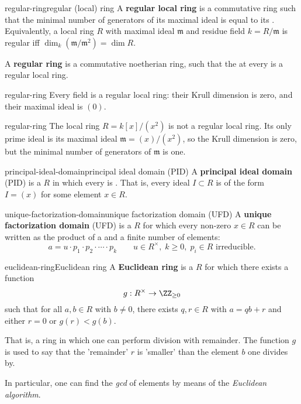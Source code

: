 \begin{topic}{regular-ring}{regular (local) ring}
    A \textbf{regular local ring} is a commutative   ring such that the minimal number of generators of its maximal ideal is equal to its . Equivalently, a local ring $R$ with maximal ideal $\mathfrak{m}$ and residue field $k = R / \mathfrak{m}$ is regular iff $\dim_k(\mathfrak{m} / \mathfrak{m}^2) = \dim R$.
    
    A \textbf{regular ring} is a commutative noetherian ring, such that the  at every  is a regular local ring.
\end{topic}

\begin{example}{regular-ring}
    Every field is a regular local ring: their Krull dimension is zero, and their maximal ideal is $(0)$.
\end{example}

\begin{example}{regular-ring}
    The local ring $R = k[x]/(x^2)$ is not a regular local ring. Its only prime ideal is its maximal ideal $\mathfrak{m} = (x)/(x^2)$, so the Krull dimension is zero, but the minimal number of generators of $\mathfrak{m}$ is one.
\end{example}

\begin{topic}{principal-ideal-domain}{principal ideal domain (PID)}
    A \textbf{principal ideal domain} (PID) is a  $R$ in which every  is . That is, every ideal $I \subset R$ is of the form $I = (x)$ for some element $x \in R$.
\end{topic}

\begin{topic}{unique-factorization-domain}{unique factorization domain (UFD)}
    A \textbf{unique factorization domain} (UFD) is a  $R$ for which every non-zero $x \in R$ can be written as the product of a  and a finite number of  elements:
    \[ a = u \cdot p_1 \cdot p_2 \cdot \cdots \cdot p_k \qquad u \in R^\times, \; k \ge 0, \; p_i \in R \text{ irreducible}. \]
\end{topic}

\begin{topic}{euclidean-ring}{Euclidean ring}
    A \textbf{Euclidean ring} is a  $R$ for which there exists a function
    \[ g : R^\times \to \ZZ_{\ge 0} \]
    such that for all $a, b \in R$ with $b \ne 0$, there exists $q, r \in R$ with $a = qb + r$ and either $r = 0$ or $g(r) < g(b)$.
    
    That is, a ring in which one can perform division with remainder. The function $g$ is used to say that the 'remainder' $r$ is 'smaller' than the element $b$ one divides by.
    
    In particular, one can find the \textit{gcd} of elements by means of the \textit{Euclidean algorithm}.
\end{topic}

